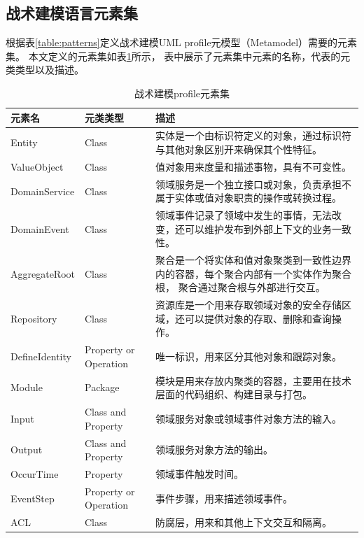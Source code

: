 \subsection{战术建模语言元素集}

根据表\ref{table:patterns}定义战术建模UML profile元模型（Metamodel）需要的元素集。
本文定义的元素集如表\ref{ProfileElementSet}所示，
表中展示了元素集中元素的名称，代表的元类类型以及描述。

{\footnotesize
\begin{longtable}[h]{m{80pt}|m{90pt}|m{205pt}}
\caption[战术建模profile元素集]{战术建模profile元素集} \label{ProfileElementSet} \\
    \hline  
    元素名&元类类型&描述\\
    \hline
    Entity&Class&实体是一个由标识符定义的对象，通过标识符与其他对象区别开来确保其个性特征。\\
    \hline
    ValueObject&Class&值对象用来度量和描述事物，具有不可变性。\\
    \hline
    DomainService&Class&领域服务是一个独立接口或对象，负责承担不属于实体或值对象职责的操作或转换过程。\\
    \hline
    DomainEvent&Class&领域事件记录了领域中发生的事情，无法改变，还可以维护发布到外部上下文的业务一致性。\\
    \hline
    AggregateRoot&Class&聚合是一个将实体和值对象聚类到一致性边界内的容器，每个聚合内部有一个实体作为聚合根，
    聚合通过聚合根与外部进行交互。\\
    \hline
    Repository&Class&资源库是一个用来存取领域对象的安全存储区域，还可以提供对象的存取、删除和查询操作。\\
    \hline
    DefineIdentity&Property or Operation&唯一标识，用来区分其他对象和跟踪对象。\\
    \hline
    Module&Package&模块是用来存放内聚类的容器，主要用在技术层面的代码组织、构建目录与打包。\\
    \hline
    Input&Class and Property&领域服务对象或领域事件对象方法的输入。\\
    \hline
    Output&Class and Property&领域服务对象方法的输出。\\   
    \hline
    OccurTime&Property&领域事件触发时间。\\
    \hline
    EventStep&Property or Operation&事件步骤，用来描述领域事件。\\
    \hline
    ACL&Class&防腐层，用来和其他上下文交互和隔离。\\
    \hline
\end{longtable} 
}

